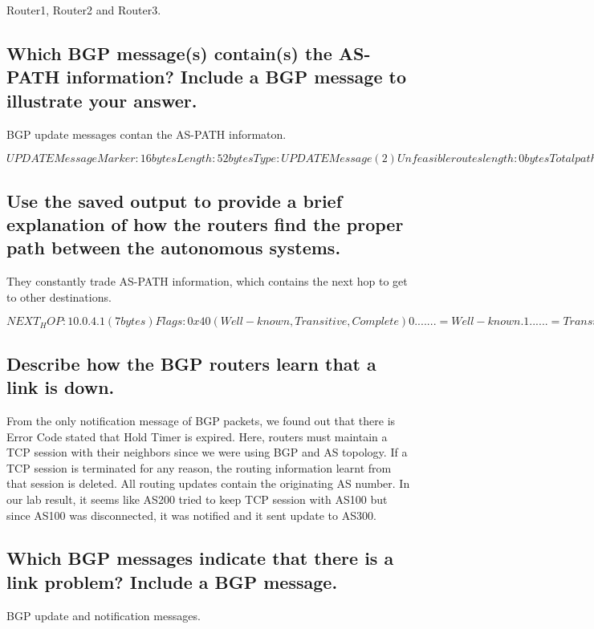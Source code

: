 \documentclass[a4paper, 11pt]{article}
\begin{document}
Router1, Router2 and Router3.

\subsection{Which BGP message(s) contain(s) the AS-PATH information? Include a BGP message to illustrate your answer.}

BGP update messages contan the AS-PATH informaton.

$UPDATE Message
        Marker: 16 bytes
        Length: 52 bytes
        Type: UPDATE Message (2)
        Unfeasible routes length: 0 bytes
        Total path attribute length: 25 bytes
        Path attributes
            ORIGIN: IGP (4 bytes)
                Flags: 0x40 (Well-known, Transitive, Complete)
                    0... .... = Well-known
                    .1.. .... = Transitive
                    ..0. .... = Complete
                    ...0 .... = Regular length$

\subsection{Use the saved output to provide a brief explanation of how the routers find the proper path between the autonomous systems. }

They constantly trade AS-PATH information, which contains the next hop to get to other destinations.

$NEXT_HOP: 10.0.4.1 (7 bytes)
                Flags: 0x40 (Well-known, Transitive, Complete)
                    0... .... = Well-known
                    .1.. .... = Transitive
                    ..0. .... = Complete
                    ...0 .... = Regular length
                Type code: NEXT_HOP (3)
                Length: 4 bytes
                Next hop: 10.0.4.1 (10.0.4.1)$

\subsection{Describe how the BGP routers learn that a link is down.}

From the only notification message of BGP packets, we found out that there is Error Code stated that Hold Timer is expired. Here, routers must maintain a TCP session with their neighbors since we were using BGP and AS topology. If a TCP session is terminated for any reason, the routing information learnt from that session is deleted. All routing updates contain the originating AS number.  In our lab result, it seems like AS200 tried to keep TCP session with AS100 but since AS100 was disconnected, it was notified and it sent update to AS300.

\subsection{Which BGP messages indicate that there is a link problem? Include a BGP message.}

BGP update and notification messages.
\end{document}
